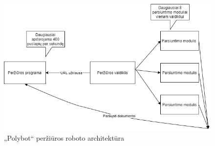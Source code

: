 \begin{figure}[htp!]
\hspace{-1cm}
\centering
\includegraphics[scale=0.6]{img/plybot.png}
\caption{„Polybot“ peržiūros roboto architektūra}
\label{fig:polybot}
\end{figure}